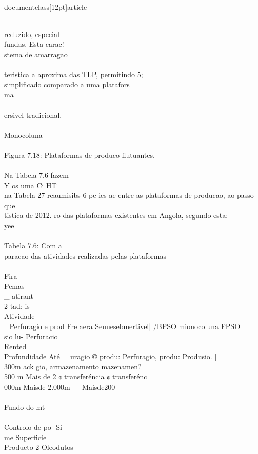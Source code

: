 \\documentclass[12pt]{article}
\begin{document}
\\
reduzido, especial\\
fundas. Esta carac!\\
stema de amarragao\\
\\
teristica a aproxima das TLP, permitindo 5;\\
simplificado comparado a uma platafors\\
ma\\
\\
ersivel tradicional.\\
\\
Monocoluna\\
\\
Figura 7.18: Plataformas de produco flutuantes.\\
\\
Na Tabela 7.6 fazem\\
¥ os uma Ci HT\\
na Tabela 27 reaumisibs 6 pe ies ae entre as plataformas de producao, ao passo que\\
tistica de 2012. ro das plataformas existentes em Angola, segundo esta:\\
yee\\
\\
Tabela 7.6: Com a\\
paracao das atividades realizadas pelas plataformas\\
\\
Fira\\
Pemas \\_ atirant\\
2 tad: is\\
Atividade ——\\_Perfuragio e prod Fre aera Seuuesebmertivel| /BPSO mionocoluna FPSO\\
sio lu- Perfuracio\\
Rented\\
Profundidade Até = uragio © produ: Perfuragio, produ: Produsio. |\\
300m ack gio, armazenamento mazenamen?\\
500 m Mais de 2 ¢ transferéncia ¢ transferénc\\
000m Maisde 2.000m — Maisde200\\
\\
Fundo do mt\\
\\
Controlo de po- Si\\
me Superficie\\
Producto 2 Oleodutos\\
\end{document}
